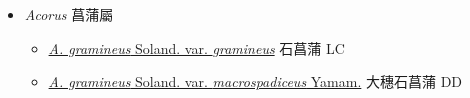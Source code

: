 
  \begin{itemize}
 \item[] \textit{Acorus} 菖蒲屬
                                
  \begin{itemize}
        \item[] \href{http://www.theplantlist.org/tpl1.1/search?q=Acorus+gramineus+var.+gramineus}{\textit{A. gramineus} Soland. var. \textit{gramineus}}   石菖蒲   LC
        \item[] \href{http://www.theplantlist.org/tpl1.1/search?q=Acorus+gramineus+var.+macrospadiceus}{\textit{A. gramineus} Soland. var. \textit{macrospadiceus} Yamam.}   大穗石菖蒲   DD
  \end{itemize}
  \end{itemize}
